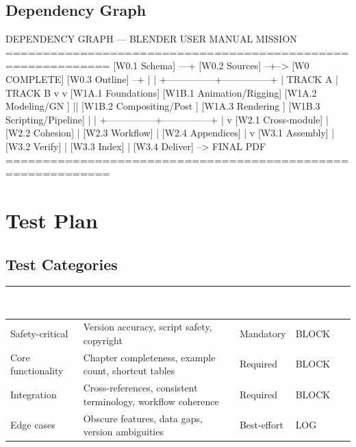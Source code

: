 \documentclass[11pt,letterpaper]{article}
\newcommand{\tableheader}[1]{\textbf{\sffamily\textcolor{white}{#1}}}
\begin{document}
\subsection{Dependency Graph}

\begin{asciibox}
DEPENDENCY GRAPH --- BLENDER USER MANUAL MISSION
============================================================
  [W0.1 Schema] ---+
  [W0.2 Sources] --+--> [W0 COMPLETE]
  [W0.3 Outline] --+          |
                              |
              +---------------+---------------+
              |   TRACK A                     |   TRACK B
              v                               v
     [W1A.1 Foundations]           [W1B.1 Animation/Rigging]
     [W1A.2 Modeling/GN ]     ||   [W1B.2 Compositing/Post ]
     [W1A.3 Rendering   ]          [W1B.3 Scripting/Pipeline]
              |                               |
              +---------------+---------------+
                              |
                              v
                    [W2.1 Cross-module]
                         |
                    [W2.2 Cohesion]
                         |
                    [W2.3 Workflow]
                         |
                    [W2.4 Appendices]
                         |
                         v
                    [W3.1 Assembly]
                         |
                    [W3.2 Verify]
                         |
                    [W3.3 Index]
                         |
                    [W3.4 Deliver] --> FINAL PDF
============================================================
\end{asciibox}

\section{Test Plan}

\subsection{Test Categories}

\begin{center}
\begin{tabularx}{\textwidth}{L{3.5cm}XC{2cm}C{2.5cm}}
\toprule
{}
\tableheader{Category} & \tableheader{Purpose} & \tableheader{Priority} & \tableheader{Failure Action} \\
\midrule
Safety-critical & Version accuracy, script safety, copyright & Mandatory & BLOCK \\
Core functionality & Chapter completeness, example count, shortcut tables & Required & BLOCK \\
Integration & Cross-references, consistent terminology, workflow coherence & Required & BLOCK \\
Edge cases & Obscure features, data gaps, version ambiguities & Best-effort & LOG \\
\bottomrule
\end{tabularx}
\end{center}
\end{document}
